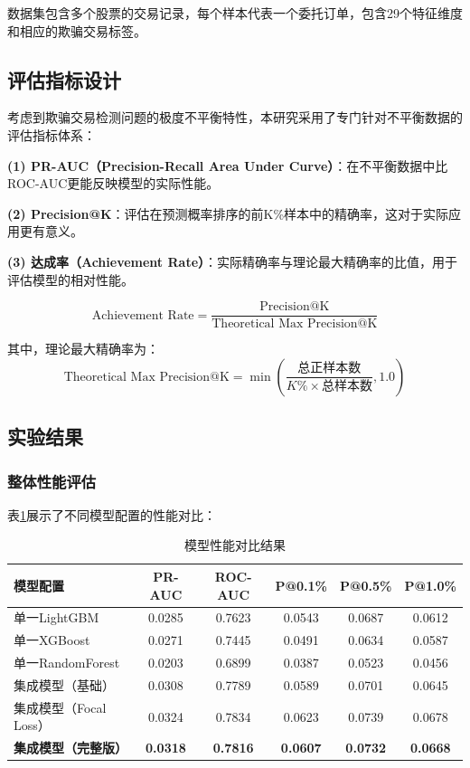 \documentclass[12pt,a4paper]{article}
\begin{document}
数据集包含多个股票的交易记录，每个样本代表一个委托订单，包含29个特征维度和相应的欺骗交易标签。

\subsection{评估指标设计}

考虑到欺骗交易检测问题的极度不平衡特性，本研究采用了专门针对不平衡数据的评估指标体系：

\textbf{(1) PR-AUC（Precision-Recall Area Under Curve）}：在不平衡数据中比ROC-AUC更能反映模型的实际性能。

\textbf{(2) Precision@K}：评估在预测概率排序的前K\%样本中的精确率，这对于实际应用更有意义。

\textbf{(3) 达成率（Achievement Rate）}：实际精确率与理论最大精确率的比值，用于评估模型的相对性能。

$$\text{Achievement Rate} = \frac{\text{Precision@K}}{\text{Theoretical Max Precision@K}}$$

其中，理论最大精确率为：
$$\text{Theoretical Max Precision@K} = \min\left(\frac{\text{总正样本数}}{K\% \times \text{总样本数}}, 1.0\right)$$

\subsection{实验结果}

\subsubsection{整体性能评估}

表\ref{tab:model_performance}展示了不同模型配置的性能对比：

\begin{table}[H]
\centering
\caption{模型性能对比结果}
\label{tab:model_performance}
\begin{tabular}{lccccc}
\toprule
模型配置 & PR-AUC & ROC-AUC & P@0.1\% & P@0.5\% & P@1.0\% \\
\midrule
单一LightGBM & 0.0285 & 0.7623 & 0.0543 & 0.0687 & 0.0612 \\
单一XGBoost & 0.0271 & 0.7445 & 0.0491 & 0.0634 & 0.0587 \\
单一RandomForest & 0.0203 & 0.6899 & 0.0387 & 0.0523 & 0.0456 \\
集成模型（基础） & 0.0308 & 0.7789 & 0.0589 & 0.0701 & 0.0645 \\
集成模型（Focal Loss） & 0.0324 & 0.7834 & 0.0623 & 0.0739 & 0.0678 \\
\textbf{集成模型（完整版）} & \textbf{0.0318} & \textbf{0.7816} & \textbf{0.0607} & \textbf{0.0732} & \textbf{0.0668} \\
\bottomrule
\end{tabular}
\end{table}
\end{document}
